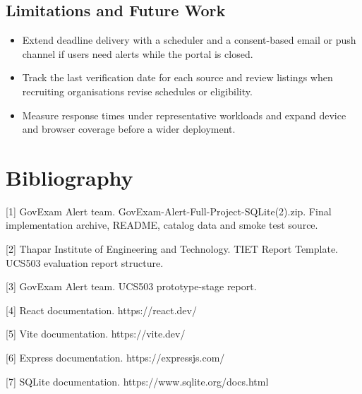\documentclass[12pt,a4paper]{report}
\begin{document}
\section{Limitations and Future Work}

\begin{itemize}
\item Extend deadline delivery with a scheduler and a consent-based email or push channel if users need alerts while the portal is closed.
\item Track the last verification date for each source and review listings when recruiting organisations revise schedules or eligibility.
\item Measure response times under representative workloads and expand device and browser coverage before a wider deployment.
\end{itemize}

\chapter*{Bibliography}

[1] GovExam Alert team. GovExam-Alert-Full-Project-SQLite(2).zip. Final implementation archive, README, catalog data and smoke test source.


[2] Thapar Institute of Engineering and Technology. TIET Report Template. UCS503 evaluation report structure.


[3] GovExam Alert team. UCS503 prototype-stage report.


[4] React documentation. https://react.dev/


[5] Vite documentation. https://vite.dev/


[6] Express documentation. https://expressjs.com/


[7] SQLite documentation. https://www.sqlite.org/docs.html
\end{document}
